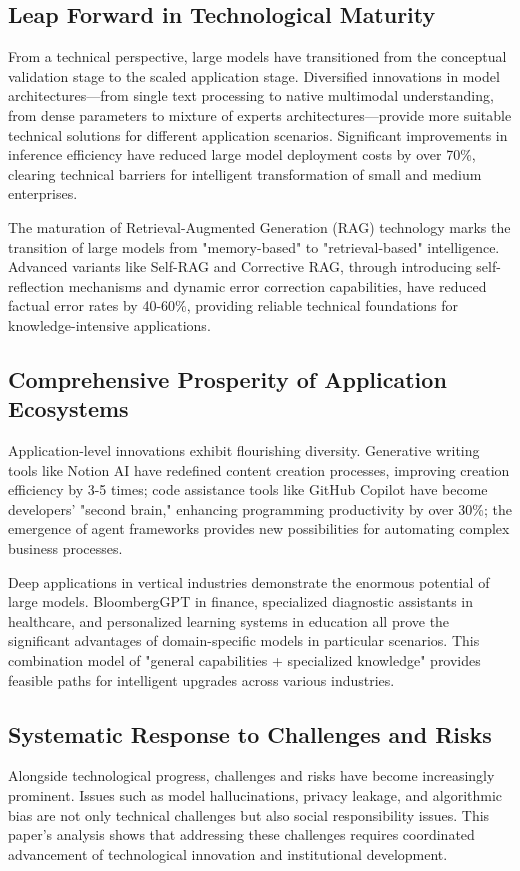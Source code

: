 \documentclass{article}
\begin{document}
\subsection{Leap Forward in Technological Maturity}
From a technical perspective, large models have transitioned from the conceptual validation stage to the scaled application stage. Diversified innovations in model architectures—from single text processing to native multimodal understanding, from dense parameters to mixture of experts architectures—provide more suitable technical solutions for different application scenarios. Significant improvements in inference efficiency have reduced large model deployment costs by over 70\%, clearing technical barriers for intelligent transformation of small and medium enterprises.

The maturation of Retrieval-Augmented Generation (RAG) technology marks the transition of large models from "memory-based" to "retrieval-based" intelligence. Advanced variants like Self-RAG and Corrective RAG, through introducing self-reflection mechanisms and dynamic error correction capabilities, have reduced factual error rates by 40-60\%, providing reliable technical foundations for knowledge-intensive applications.

\subsection{Comprehensive Prosperity of Application Ecosystems}
Application-level innovations exhibit flourishing diversity. Generative writing tools like Notion AI have redefined content creation processes, improving creation efficiency by 3-5 times; code assistance tools like GitHub Copilot have become developers' "second brain," enhancing programming productivity by over 30\%; the emergence of agent frameworks provides new possibilities for automating complex business processes.

Deep applications in vertical industries demonstrate the enormous potential of large models. BloombergGPT in finance, specialized diagnostic assistants in healthcare, and personalized learning systems in education all prove the significant advantages of domain-specific models in particular scenarios. This combination model of "general capabilities + specialized knowledge" provides feasible paths for intelligent upgrades across various industries.

\subsection{Systematic Response to Challenges and Risks}
Alongside technological progress, challenges and risks have become increasingly prominent. Issues such as model hallucinations, privacy leakage, and algorithmic bias are not only technical challenges but also social responsibility issues. This paper's analysis shows that addressing these challenges requires coordinated advancement of technological innovation and institutional development.
\end{document}
